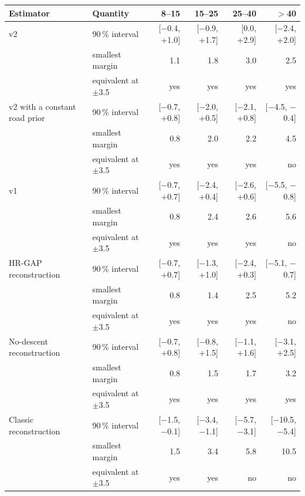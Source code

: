 \begin{tabular}{@{}llrrrr@{}}
\toprule
Estimator & Quantity & 8--15 & 15--25 & 25--40 & $>$40 \\
\midrule
\ascent{} v2 & 90\,\% interval & [$-$0.4, +1.0] & [$-$0.9, +1.7] & [0.0, +2.9] & [$-$2.4, +2.0] \\
 & smallest margin & 1.1 & 1.8 & 3.0 & 2.5 \\
 & equivalent at $\pm$3.5 & yes & yes & yes & yes \\
\addlinespace[2pt]
v2 with a constant road prior & 90\,\% interval & [$-$0.7, +0.8] & [$-$2.0, +0.5] & [$-$2.1, +0.8] & [$-$4.5, $-$0.4] \\
 & smallest margin & 0.8 & 2.0 & 2.2 & 4.5 \\
 & equivalent at $\pm$3.5 & yes & yes & yes & no \\
\addlinespace[2pt]
\ascent{} v1 & 90\,\% interval & [$-$0.7, +0.7] & [$-$2.4, +0.4] & [$-$2.6, +0.6] & [$-$5.5, $-$0.8] \\
 & smallest margin & 0.8 & 2.4 & 2.6 & 5.6 \\
 & equivalent at $\pm$3.5 & yes & yes & yes & no \\
\addlinespace[2pt]
HR-GAP reconstruction & 90\,\% interval & [$-$0.7, +0.7] & [$-$1.3, +1.0] & [$-$2.4, +0.3] & [$-$5.1, $-$0.7] \\
 & smallest margin & 0.8 & 1.4 & 2.5 & 5.2 \\
 & equivalent at $\pm$3.5 & yes & yes & yes & no \\
\addlinespace[2pt]
No-descent reconstruction & 90\,\% interval & [$-$0.7, +0.8] & [$-$0.8, +1.5] & [$-$1.1, +1.6] & [$-$3.1, +2.5] \\
 & smallest margin & 0.8 & 1.5 & 1.7 & 3.2 \\
 & equivalent at $\pm$3.5 & yes & yes & yes & yes \\
\addlinespace[2pt]
Classic reconstruction & 90\,\% interval & [$-$1.5, $-$0.1] & [$-$3.4, $-$1.1] & [$-$5.7, $-$3.1] & [$-$10.5, $-$5.4] \\
 & smallest margin & 1.5 & 3.4 & 5.8 & 10.5 \\
 & equivalent at $\pm$3.5 & yes & yes & no & no \\
\bottomrule
\end{tabular}
